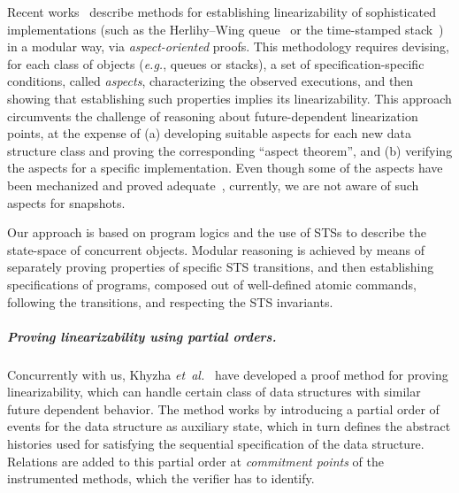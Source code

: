 \documentclass[a4paper,UKenglish]{lipics-v2016}
\newcommand{\eg}{\emph{e.g.}\xspace}
\newcommand{\etal}{\emph{et~al.}\xspace}
\theoremstyle{definition}
\begin{document}
Recent works~\cite{HenzingerSV+CONCUR13, ChakrabortyHSV+LMCS15,
  DoddsHK+POPL15} describe methods for establishing linearizability of
sophisticated implementations (such as the Herlihy--Wing
queue~\cite{HerlihyW+TOPLAS90} or the time-stamped
stack~\cite{DoddsHK+POPL15}) in a modular way, via
\emph{aspect-oriented} proofs.
%
This methodology requires devising, for each class of objects (\eg,
queues or stacks), a set of specification-specific conditions, called
{\it aspects}, characterizing the observed executions, and then
showing that establishing such properties implies its linearizability.
%
This approach circumvents the challenge of reasoning about
future-dependent linearization points, at the expense of (a)
developing suitable aspects for each new data structure class and
proving the corresponding ``aspect theorem'', and (b) verifying the
aspects for a specific implementation. 
%
%
Even though some of the aspects have been mechanized and proved
adequate~\cite{DoddsHK+POPL15}, 
%
currently, we are not aware of such aspects for snapshots.



Our approach is based on program logics and the use of STSs to
describe the state-space of concurrent objects. Modular reasoning is
achieved by means of separately proving properties of specific STS
transitions, and then establishing specifications of programs,
composed out of well-defined atomic commands, following the
transitions, and respecting the STS invariants.

\subparagraph*{Proving linearizability using partial orders.}
Concurrently with us, Khyzha \etal~\cite{KhyzhaGP+ESOP17} have
developed a proof method for proving linearizability, which can handle
certain class of data structures with similar future dependent
behavior.
%
The method works by introducing a partial order of events for the data
structure as auxiliary state, which in turn defines the abstract
histories used for satisfying the sequential specification of the data
structure. Relations are added to this partial order at {\it
  commitment points} of the instrumented methods, which the verifier
has to identify.
\end{document}

